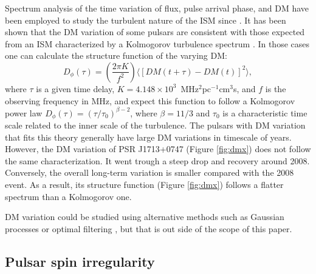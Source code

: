 
Spectrum analysis of the time variation of flux, pulse arrival phase, and DM have 
been employed to study the turbulent nature of the ISM since \citealt{cpl86, rl90}.
It has been shown that the DM variation of some pulsars are consistent with
those expected from an ISM characterized by a Kolmogorov turbulence spectrum
\citep{cwd+90, ric90, ktr94, yhc+07, kcs+13, fst14}. In those cases one can calculate the 
structure function of the varying DM: 
\begin{equation}
D_{\phi}(\tau)=\left(\frac{2\pi K}{f^2}\right)\langle [DM(t+\tau)-DM(t)]^2\rangle, 
\end{equation}
where $\tau$ 
is a given time delay, $K=4.148\times10^3$~MHz$^2$pc$^{-1}$cm$^3$s, and $f$ is 
the observing frequency in MHz, and expect 
this function to follow a Kolmogorov power law $D_{\phi}(\tau)=(\tau/\tau_0)^{\beta -2}$, 
where $\beta=11/3$ and $\tau_0$ is a characteristic time scale related to 
the inner scale of the turbulence. The pulsars with DM variation that fits this
theory generally have large DM variations in timescale of 
years. However, the DM variation of PSR J1713+0747 (Figure \ref{fig:dmx}) does not 
follow the same characterization. It went trough a steep drop and recovery 
around 2008. Conversely, the overall long-term variation is smaller
compared with the 2008 event. As a result, its structure function (Figure \ref{fig:dmx}) 
follows a flatter spectrum than a Kolmogorov one.

DM variation could be studied using alternative methods such as Gaussian processes 
\citep{vv14a} or optimal filtering \citep{lbj+14}, but that is out side of the scope of 
this paper.

\subsection{Pulsar spin irregularity}
\label{sec:spin}


